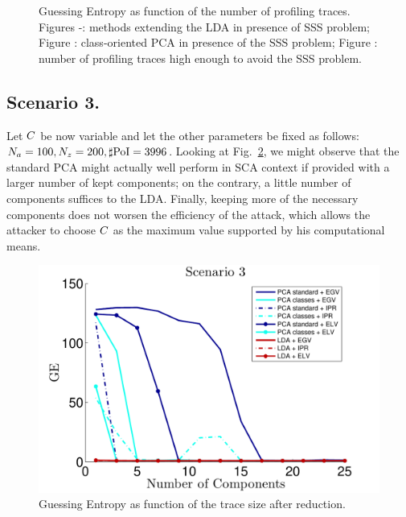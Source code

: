 \begin{figure}
\caption[Guessing Entropy as function of the number of profiling traces.]{Guessing Entropy as function of the number of profiling traces. Figures -: methods extending the LDA in presence of SSS problem; Figure : class-oriented PCA in presence of the SSS problem; Figure : number of profiling traces high enough to avoid the SSS problem.}\label{fig:scenario2}
\end{figure}


\subsection{Scenario 3.}
Let  $C$ be now variable and let the other parameters be fixed as follows: $N_a = 100, N_z=200, \sharp\mathrm{PoI} = 3996$. Looking at Fig.~\ref{fig:3}, we might observe that the standard PCA might actually well perform in SCA context if provided with a larger number of kept components; on the contrary, a little number of components suffices to the LDA. Finally, keeping more of the necessary components does not worsen the efficiency of the attack, which allows the attacker to choose $C$ as the maximum value supported by his computational means. 

\begin{figure}
\centering
\includegraphics[width=.5\textwidth]{../Figures/CARDIS2015/Criterion3.pdf}
\caption{Guessing Entropy as function of the trace size after reduction.}\label{fig:3}
\end{figure}

